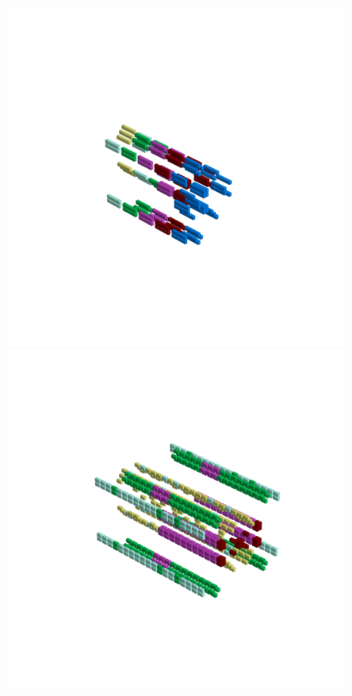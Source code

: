 \begin{figure}[H]
      \vspace*{-9cm}
      \hspace*{-7cm}
      \includegraphics[width=15cm]{src/symmetries/pattern14_3-45.png} \\
      \vspace*{-12cm}
      \includegraphics[width=15cm]{src/symmetries/pattern14_4-45.png}
      \vspace*{-4cm}
\caption*{}
\end{figure}

